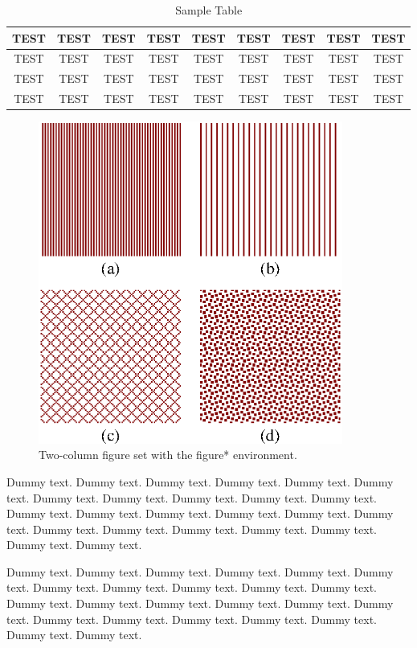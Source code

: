\documentclass[10pt,letterpaper,twocolumn]{article} %
\begin{document}
\begin{table}[htb]
  \centering
  \caption{Sample Table}\begin{tabular}{ccccccccc} \\ \hline
    TEST & TEST & TEST & TEST & TEST & TEST & TEST & TEST & TEST\\ \hline
    TEST & TEST & TEST & TEST & TEST & TEST & TEST & TEST & TEST\\
    TEST & TEST & TEST & TEST & TEST & TEST & TEST & TEST & TEST\\
    TEST & TEST & TEST & TEST & TEST & TEST & TEST & TEST & TEST\\ \hline
  \end{tabular}
\end{table}


\begin{figure}[t]
\centerline{\includegraphics[width=10cm]{sample.eps}}
\caption{Two-column figure set with the figure* environment.}
\end{figure}


Dummy text. Dummy text. Dummy text. Dummy text. Dummy text. Dummy text. Dummy text. Dummy text. Dummy text. Dummy text. Dummy text. Dummy text. Dummy text. Dummy text. Dummy text. Dummy text. Dummy text. Dummy text. Dummy text. Dummy text. Dummy text. Dummy text. Dummy text. Dummy text.

Dummy text. Dummy text. Dummy text. Dummy text. Dummy text. Dummy text. Dummy text. Dummy text. Dummy text. Dummy text. Dummy text. Dummy text. Dummy text. Dummy text. Dummy text. Dummy text. Dummy text. Dummy text. Dummy text. Dummy text. Dummy text. Dummy text. Dummy text. Dummy text. 
\end{document}
